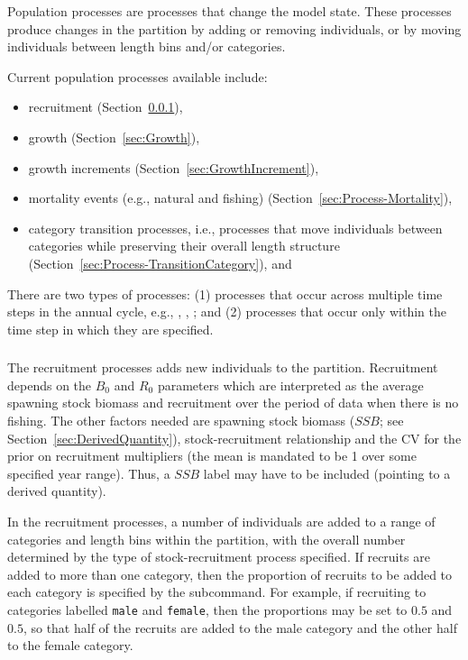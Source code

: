 
Population processes are processes that change the model state. These processes produce changes in the partition by adding or removing individuals, or by moving individuals between length bins and/or categories.

Current population processes available include:

\begin{itemize}
\item recruitment (Section~\ref{sec:Process-Recruitment}),
\ifAgeBased
\item growth (Section~\ref{sec:Growth}),
\else
\item growth increments (Section~\ref{sec:GrowthIncrement}),
\fi
\item mortality events (e.g., natural and fishing) (Section~\ref{sec:Process-Mortality}), 
\item category transition processes, i.e., processes that move individuals between categories while preserving their overall length structure (Section~\ref{sec:Process-TransitionCategory}), and
\end{itemize}

There are two types of processes: (1) processes that occur across multiple time steps in the annual cycle, e.g., , , ; and (2) processes that occur only within the time step in which they are specified.

\subsubsection{}\label{sec:Process-Recruitment}

The recruitment processes adds new individuals to the partition. Recruitment depends on the \(B_{0}\) and \(R_{0}\) parameters which are interpreted as the average spawning stock biomass and recruitment over the period of data when there is no fishing. The other factors needed are spawning stock biomass ($SSB$; see Section~\ref{sec:DerivedQuantity}), stock-recruitment relationship and the CV for the prior on recruitment multipliers (the mean is mandated to be 1 over some specified year range). Thus, a $SSB$ label may have to be included (pointing to a derived quantity).

In the recruitment processes, a number of individuals are added to a range of categories and length bins within the partition, with the overall number determined by the type of stock-recruitment process specified. If recruits are added to more than one category, then the proportion of recruits to be added to each category is specified by the  subcommand. For example, if recruiting to categories labelled \texttt{male} and \texttt{female}, then the proportions may be set to $0.5$ and $0.5$, so that half of the recruits are added to the male category and the other half to the female category.

